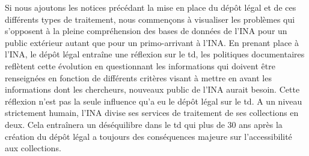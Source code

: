 Si nous ajoutons les notices précédant la mise en place du dépôt légal et de ces différents types de traitement, nous commençons à visualiser les problèmes qui s’opposent à la pleine compréhension des bases de données de l’INA pour un public extérieur autant que pour un primo-arrivant à l’INA. En prenant place à l'INA, le dépôt légal entraîne une réflexion sur le \gls{td}, les politiques documentaires reflètent cette évolution en questionnant les informations qui doivent être renseignées en fonction de différents critères visant à mettre en avant les informations dont les chercheurs, nouveaux public de l'INA aurait besoin. Cette réflexion n'est pas la seule influence qu'a eu le dépôt légal sur le \gls{td}. A un niveau strictement humain, l'INA divise ses services de traitement de ses collections en deux. Cela entraînera un déséquilibre dans le \gls{td} qui plus de 30 ans après la création du dépôt légal a toujours des conséquences majeure sur l'accessibilité aux collections. 